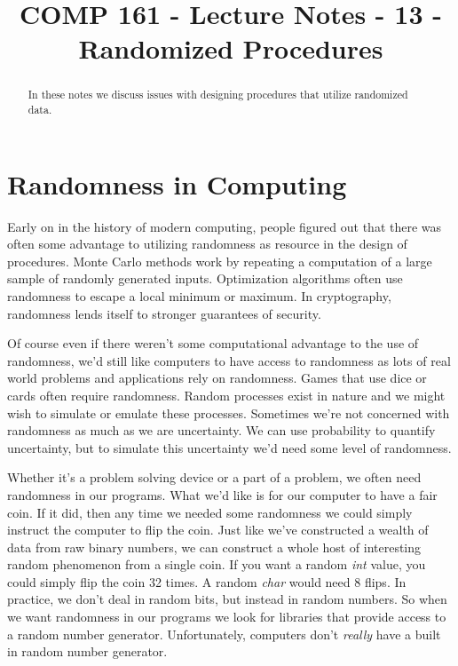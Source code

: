 \documentclass[]{tufte-handout}
\title{COMP 161 - Lecture Notes - 13 - Randomized Procedures}
\date{}
\begin{document}
 
\maketitle

\begin{abstract}
In these notes we discuss issues with designing procedures that utilize randomized data.
\end{abstract}


\section{Randomness in Computing}

Early on in the history of modern computing, people figured out that there was often some advantage to utilizing randomness as resource in the design of procedures.  Monte Carlo methods work by repeating a computation of a large sample of randomly generated inputs. Optimization algorithms often use randomness to escape a local minimum or maximum.  In cryptography, randomness lends itself to stronger guarantees of security.  

Of course even if there weren't some computational advantage to the use of randomness, we'd still like computers to have access to randomness as lots of real world problems and applications rely on randomness. Games that use dice or cards often require randomness. Random processes exist in nature and we might wish to simulate or emulate these processes.  Sometimes we're not concerned with randomness as much as we are uncertainty. We can use probability to quantify uncertainty, but to simulate this uncertainty we'd need some level of randomness. 

Whether it's a problem solving device or a part of a problem, we often need randomness in our programs. What we'd like is for our computer to have a fair coin. If it did, then any time we needed some randomness we could simply instruct the computer to flip the coin.  Just like we've constructed a wealth of data from raw binary numbers, we can construct a whole host of interesting random phenomenon  from a single coin. If you want a random \textit{int} value, you could simply flip the coin 32 times. A random \textit{char} would need 8 flips.  In practice, we don't deal in random bits, but instead in random numbers.  So when we want randomness in our programs we look for libraries that provide access to a random number generator.  Unfortunately, computers don't \textit{really} have a built in random number generator.
\end{document}
